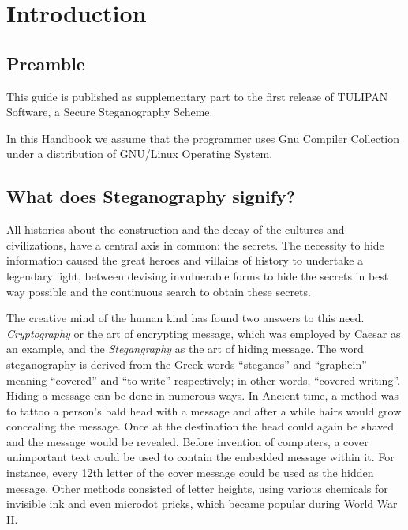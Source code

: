
\chapter{Introduction}
\begin{flushright}\end{flushright}

\section{Preamble}

This guide is published as supplementary part to the first release of TULIPAN Software, a Secure Steganography Scheme. 

In this Handbook we assume that the programmer uses Gnu Compiler Collection under a distribution of GNU/Linux Operating System.

\section{What does Steganography signify?}

All histories about the construction and the decay of the cultures and civilizations, have a central axis in common: the secrets. The necessity to hide information caused the great heroes and villains of history to undertake a legendary fight, between devising invulnerable forms to hide the secrets in best way possible and the continuous search to obtain these secrets.
        
 The creative mind of the human kind has found two answers to this need. {\it Cryptography} or the art of encrypting message, which was employed by Caesar as an example, and the {\it Stegangraphy} as the art of hiding message. The word steganography is derived from the Greek words ``steganos'' and ``graphein'' meaning ``covered'' and ``to write'' respectively; in other words, ``covered writing''. Hiding a message can be done in numerous ways. In Ancient time, a method was to tattoo a person's bald head with a message and after a while hairs would grow concealing the message. Once at the destination the head could again be shaved and the message would be revealed. Before invention of computers, a cover unimportant text could be used to contain the embedded message within it. For instance, every 12th letter of the cover message could be used as the hidden message. Other methods consisted of letter heights, using various chemicals for invisible ink and even microdot pricks, which became popular during World War II.
        
